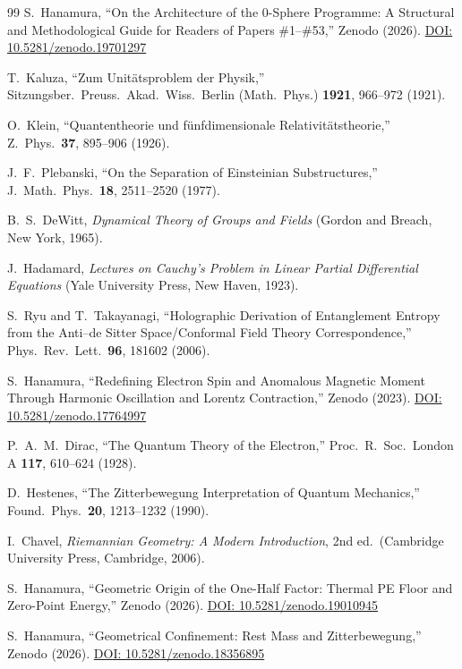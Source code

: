 \documentclass[%
 reprint, amsmath,amssymb, aps, prd, ]{revtex4-2}
\numberwithin{equation}{section}
\begin{document}
\begin{thebibliography}{99}
S.~Hanamura, ``On the Architecture of the 0-Sphere Programme: A Structural and Methodological Guide for Readers of Papers \#1--\#53,'' Zenodo (2026). \href{https://doi.org/10.5281/zenodo.19701297}{DOI: 10.5281/zenodo.19701297}

T.~Kaluza, ``Zum Unit\"{a}tsproblem der Physik,'' Sitzungsber.\ Preuss.\ Akad.\ Wiss.\ Berlin (Math.\ Phys.) \textbf{1921}, 966--972 (1921).

O.~Klein, ``Quantentheorie und f\"{u}nfdimensionale Relativit\"{a}tstheorie,'' Z.\ Phys.\ \textbf{37}, 895--906 (1926).

J.~F.~Plebanski, ``On the Separation of Einsteinian Substructures,'' J.\ Math.\ Phys.\ \textbf{18}, 2511--2520 (1977).

B.~S.~DeWitt, \textit{Dynamical Theory of Groups and Fields} (Gordon and Breach, New York, 1965).

J.~Hadamard, \textit{Lectures on Cauchy's Problem in Linear Partial Differential Equations} (Yale University Press, New Haven, 1923).

S.~Ryu and T.~Takayanagi, ``Holographic Derivation of Entanglement Entropy from the Anti--de Sitter Space/Conformal Field Theory Correspondence,'' Phys.\ Rev.\ Lett.\ \textbf{96}, 181602 (2006).

S.~Hanamura, ``Redefining Electron Spin and Anomalous Magnetic Moment Through Harmonic Oscillation and Lorentz Contraction,'' Zenodo (2023). \href{https://doi.org/10.5281/zenodo.17764997}{DOI: 10.5281/zenodo.17764997}

P.~A.~M.~Dirac, ``The Quantum Theory of the Electron,'' Proc.\ R.\ Soc.\ London A \textbf{117}, 610--624 (1928).

D.~Hestenes, ``The Zitterbewegung Interpretation of Quantum Mechanics,'' Found.\ Phys.\ \textbf{20}, 1213--1232 (1990).

I.~Chavel, \textit{Riemannian Geometry: A Modern Introduction}, 2nd ed.\ (Cambridge University Press, Cambridge, 2006).

S.~Hanamura, ``Geometric Origin of the One-Half Factor: Thermal PE Floor and Zero-Point Energy,'' Zenodo (2026). \href{https://doi.org/10.5281/zenodo.19010945}{DOI: 10.5281/zenodo.19010945}

S.~Hanamura, ``Geometrical Confinement: Rest Mass and Zitterbewegung,'' Zenodo (2026). \href{https://doi.org/10.5281/zenodo.18356895}{DOI: 10.5281/zenodo.18356895}


\end{thebibliography}
\end{document}
